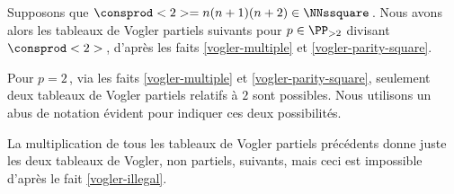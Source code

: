 Supposons que $\consprod<2> = n(n+1)(n+2) \in \NNssquare$\,. Nous avons alors les tableaux de Vogler partiels suivants pour $p \in \PP_{>2}$ divisant $\consprod<2>$\,, d'après les faits \ref{vogler-multiple} et \ref{vogler-parity-square}.

\begin{center}
\end{center}


Pour $p = 2$\,, via les faits \ref{vogler-multiple} et \ref{vogler-parity-square}, seulement deux tableaux de Vogler partiels relatifs à $2$ sont possibles. Nous utilisons un abus de notation évident pour indiquer ces deux possibilités.

\begin{center}
\end{center}


La multiplication de tous les tableaux de Vogler partiels précédents donne juste les deux tableaux de Vogler, non partiels, suivants, mais ceci est impossible d'après le fait \ref{vogler-illegal}.

\begin{center}
\end{center}